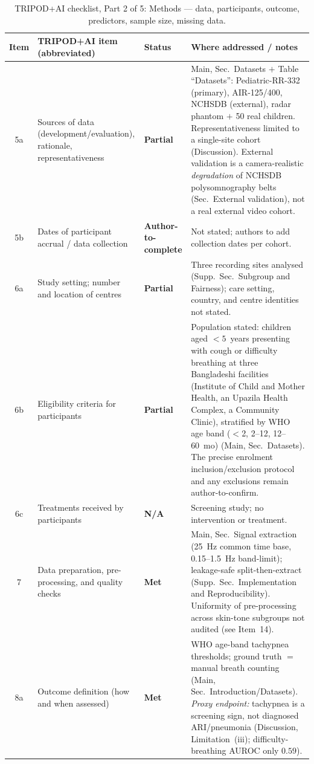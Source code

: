 \begin{table}[!tp]
\caption{TRIPOD+AI checklist, Part 2 of 5: Methods --- data, participants, outcome, predictors, sample size,
missing data.}
\label{tab:tripod-b}\centering\footnotesize
\begin{tabular}{@{}c >{\raggedright\arraybackslash}p{1.65in} >{\raggedright\arraybackslash}p{0.70in} >{\raggedright\arraybackslash}p{3.35in}@{}}
\toprule
Item & TRIPOD+AI item (abbreviated) & Status & Where addressed / notes\\\midrule
5a & Sources of data (development/evaluation), rationale, representativeness
   & \textbf{Partial}
   & Main, Sec.~Datasets $+$ Table ``Datasets'': Pediatric-RR-332 (primary), AIR-125/400, NCHSDB (external), radar phantom $+$ 50 real children. Representativeness limited to a single-site cohort (Discussion). External validation is a camera-realistic \emph{degradation} of NCHSDB polysomnography belts (Sec.~External validation), not a real external video cohort.\\
5b & Dates of participant accrual / data collection
   & \textbf{Author-to-complete}
   & Not stated; authors to add collection dates per cohort.\\
6a & Study setting; number and location of centres
   & \textbf{Partial}
   & Three recording sites analysed (Supp.~Sec.~Subgroup and Fairness); care setting, country, and centre identities not stated.\\
6b & Eligibility criteria for participants
   & \textbf{Partial}
   & Population stated: children aged $<5$~years presenting with cough or difficulty breathing at three
Bangladeshi facilities (Institute of Child and Mother Health, an Upazila Health Complex, a Community
Clinic), stratified by WHO age band ($<$2, 2--12, 12--60~mo) (Main, Sec.~Datasets). The precise
enrolment inclusion/exclusion protocol and any exclusions remain author-to-confirm.\\
6c & Treatments received by participants
   & \textbf{N/A}
   & Screening study; no intervention or treatment.\\
7  & Data preparation, pre-processing, and quality checks
   & \textbf{Met}
   & Main, Sec.~Signal extraction (25~Hz common time base, 0.15--1.5~Hz band-limit); leakage-safe split-then-extract (Supp.~Sec.~Implementation and Reproducibility). Uniformity of pre-processing across skin-tone subgroups not audited (see Item~14).\\
8a & Outcome definition (how and when assessed)
   & \textbf{Met}
   & WHO age-band tachypnea thresholds; ground truth $=$ manual breath counting (Main, Sec.~Introduction/Datasets). \emph{Proxy endpoint:} tachypnea is a screening sign, not diagnosed ARI/pneumonia (Discussion, Limitation~(iii); difficulty-breathing AUROC only $0.59$).\\

\end{tabular}
\end{table}
